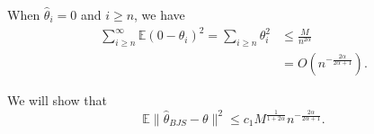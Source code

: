 \documentclass[twoside]{article}
\theoremstyle{definition}
\theoremstyle{definition}
\theoremstyle{remark}
\begin{document}
When $\hat\theta_i = 0$ and $i \geq n$, we have
\[
\begin{aligned}
\sum \limits_{i \geq n}^\infty \mathbb{E} (0 - \theta_i)^2 = \sum \limits_{i \geq n} \theta_i^2 &\leq \frac{M}{n^{2\alpha}} \\
&= O(n^{-\frac{2\alpha}{2\alpha + 1}}).
\end{aligned}
\]

We will show that
\[
\mathbb{E} \| \hat\theta_{BJS} - \theta \|^2 \leq c_1 M^{\frac{1}{1+2\alpha}} n^{-\frac{2\alpha}{2\alpha + 1}}.
\]

\nocite{*}


\end{document}
